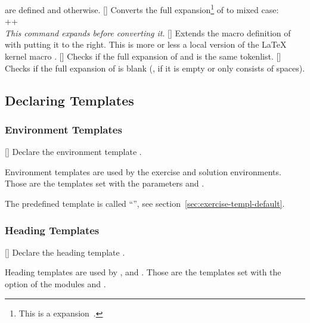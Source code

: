 \documentclass{xsim-manual}
\begin{document}
\begin{commands}
     are defined and  otherwise.
  []
    Converts the full expansion\footnote{This is a 
      expansion~\cite{texsx:romannumeral}.\label{fn:romannumeral}} of
     to mixed case: \\
    \verbcode++  \\
    \emph{This command expands  before converting it}.
  []
    Extends the macro definition of  with  putting it
    to the right.  This is more or less a local version of the LaTeX kernel
    macro .
  \expandable{}[]
    Checks if the full expansion of  and
     is the same tokenlist.
  \expandable{}[]
    Checks if the full expansion of  is
    blank (\ie, if it is empty or only consists of spaces). 
\end{commands}

\subsection{Declaring Templates}
\subsubsection{Environment Templates}\label{sec:envir-templ}
\begin{commands}
  []
    Declare the environment template .
\end{commands}
Environment templates are used by the exercise and solution environments.
Those are the templates set with the parameters 
and .

The predefined template is called \enquote{}, see
section~\vref{sec:exercise-templ-default}.

\subsubsection{Heading Templates}\label{sec:heading-templates}
\begin{commands}
  []
    Declare the heading template .
\end{commands}
Heading templates are used by ,  and
.  Those are the templates set with the option
 of the modules  and
.
\end{document}
